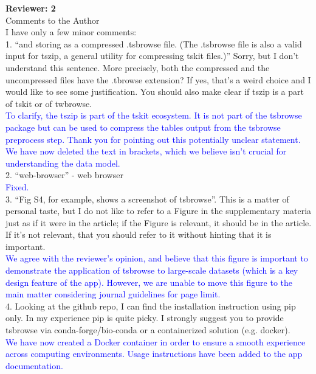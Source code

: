 \documentclass{article}
\begin{document}
\textbf{Reviewer: 2}\\

Comments to the Author\\

I have only a few minor comments:\\
1. ``and storing as a compressed .tsbrowse file. (The .tsbrowse file is also a valid input for
tszip, a general utility for compressing tskit files.)'' Sorry, but I don't understand this sentence. 
More precisely, both the compressed and the uncompressed files have the .tbrowse extension? If yes, 
that's a weird choice and I would like to see some justification. You should also make clear if tszip 
is a part of tskit or of twbrowse.\\
\textcolor{blue}{To clarify, the tszip is part of the tskit ecosystem. It is not part of the tsbrowse 
package but can be used to compress the tables output from the tsbrowse preprocess step. Thank you 
for pointing out this potentially unclear statement. We have now deleted the text 
in brackets, which we believe isn't crucial for understanding the data model.}\\

2. ``web-browser'' - web browser\\
\textcolor{blue}{Fixed.}\\

3. ``Fig S4, for example, shows a screenshot of tsbrowse''. This is a matter of personal taste, but I do
not like to refer to a Figure in the supplementary materia just as if it were in the article; if the 
Figure is relevant, it should be in the article. If it's not relevant, that you should refer to it without
hinting that it is important.\\
\textcolor{blue}{We agree with the reviewer's opinion, and believe that this figure is important 
to demonstrate the application of tsbrowse to large-scale datasets (which is a key design 
feature of the app). However, we are unable to move this figure to the main matter considering journal 
guidelines for page limit.}\\

4. Looking at the github repo, I can find the installation instruction using pip only. In my experience 
pip is quite picky. I strongly suggest you to provide tsbrowse via conda-forge/bio-conda or a containerized 
solution (e.g. docker).\\
\textcolor{blue}{We have now created a Docker container in order to ensure a smooth experience across 
computing environments. Usage instructions have been added to the app documentation.}\\
\end{document}
